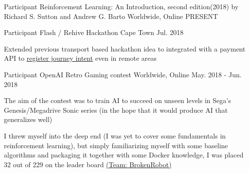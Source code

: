 

\begin{cventries}

  \cventry
    {Participant} %
    {Reinforcement Learning: An Introduction, second edition(2018) by Richard S. Sutton and Andrew G. Barto} %
    {Worldwide, Online} %
    {PRESENT} %
    {
      \begin{cvitems} %
      \end{cvitems}
    }

  \cventry
    {Participant} %
    {Flash / Rehive Hackathon} %
    {Cape Town} %
    {Jul. 2018 } %
    {
      \begin{cvitems} %
        \item {Extended previous transport based hackathon idea to integrated with a payment API to \href{https://github.com/dnk8n/root.us}{register journey intent} even in remote areas}
      \end{cvitems}
    }

  \cventry
    {Participant} %
    {OpenAI Retro Gaming contest} %
    {Worldwide, Online} %
    {May. 2018 - Jun. 2018} %
    {
      \begin{cvitems} %
        \item {The aim of the contest was to train AI to succeed on unseen levels in Sega’s Genesis/Megadrive Sonic series (in the hope that it would produce AI that generalizes well)}
        \item {I threw myself into the deep end (I was yet to cover some fundamentals in reinforcement learning), but simply familiarizing myself with some baseline algorithms and packaging it together with some Docker knowledge, I was placed 32 out of 229 on the leader board {\href{https://contest.openai.com/2018-1/users/314}{(Team: BrokenRobot)}}}
      \end{cvitems}
    }


\end{cventries}
